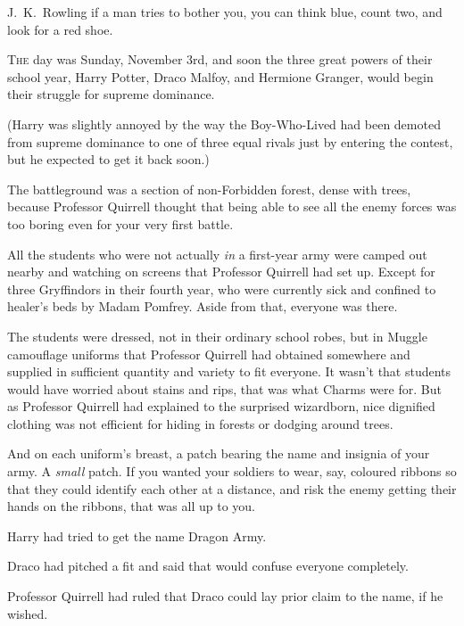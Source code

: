 
\begin{chapterOpeningAuthorNote}
J.~K.~Rowling if a man tries to bother you, you can think blue, count two, and look for a red shoe.
\end{chapterOpeningAuthorNote}

\lettrine{T}{he} day was Sunday, November 3rd, and soon the three great powers of their school year, Harry Potter, Draco Malfoy, and Hermione Granger, would begin their struggle for supreme dominance.

(Harry was slightly annoyed by the way the Boy-Who-Lived had been demoted from supreme dominance to one of three equal rivals just by entering the contest, but he expected to get it back soon.)

The battleground was a section of non-Forbidden forest, dense with trees, because Professor Quirrell thought that being able to see all the enemy forces was too boring even for your very first battle.

All the students who were not actually \emph{in} a first-year army were camped out nearby and watching on screens that Professor Quirrell had set up. Except for three Gryffindors in their fourth year, who were currently sick and confined to healer’s beds by Madam Pomfrey. Aside from that, everyone was there.

The students were dressed, not in their ordinary school robes, but in Muggle camouflage uniforms that Professor Quirrell had obtained somewhere and supplied in sufficient quantity and variety to fit everyone. It wasn’t that students would have worried about stains and rips, that was what Charms were for. But as Professor Quirrell had explained to the surprised wizardborn, nice dignified clothing was not efficient for hiding in forests or dodging around trees.

And on each uniform’s breast, a patch bearing the name and insignia of your army. A \emph{small} patch. If you wanted your soldiers to wear, say, coloured ribbons so that they could identify each other at a distance, and risk the enemy getting their hands on the ribbons, that was all up to you.

Harry had tried to get the name Dragon Army.

Draco had pitched a fit and said that would confuse everyone completely.

Professor Quirrell had ruled that Draco could lay prior claim to the name, if he wished.

